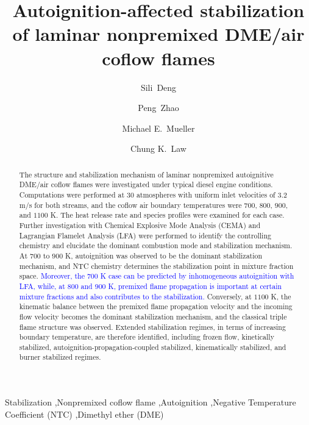 \documentclass[review,3p,times]{elsarticle}
\begin{document}
\begin{frontmatter}

\title{Autoignition-affected stabilization of laminar nonpremixed DME/air coflow flames}

\author{Sili~Deng}
\author{Peng~Zhao}
\author{Michael E.~Mueller}
\author{Chung K.~Law}

\address{Department of Mechanical and Aerospace Engineering, Princeton University, Princeton, NJ 08544, USA}

\begin{abstract}

The structure and stabilization mechanism of laminar nonpremixed autoignitive DME/air coflow flames were investigated under typical diesel engine conditions.  Computations were performed at $30$ atmospheres with uniform inlet velocities of $3.2$ m/s for both streams, and the coflow air boundary temperatures were $700$, $800$, $900$, and $1100$ K.  The heat release rate and species profiles were examined for each case. Further investigation with Chemical Explosive Mode Analysis (CEMA) and Lagrangian Flamelet Analysis (LFA) were performed to identify the controlling chemistry and elucidate the dominant combustion mode and stabilization mechanism.  At $700$ to $900$ K, autoignition was observed to be the dominant stabilization mechanism, and NTC chemistry determines the stabilization point in mixture fraction space.  \textcolor{blue}{Moreover, the $700$ K case can be predicted by inhomogeneous autoignition with LFA, while, at $800$ and $900$ K, premixed flame propagation is important at certain mixture fractions and also contributes to the stabilization.}  Conversely, at $1100$ K, the kinematic balance between the premixed flame propagation velocity and the incoming flow velocity becomes the dominant stabilization mechanism, and the classical triple flame structure was observed.  Extended stabilization regimes, in terms of increasing boundary temperature, are therefore identified, including frozen flow, kinetically stabilized, autoignition-propagation-coupled stabilized, kinematically stabilized, and burner stabilized regimes.           

\end{abstract}

\begin{keyword} 
Stabilization \sep Nonpremixed coflow flame \sep Autoignition \sep Negative Temperature Coefficient (NTC) \sep Dimethyl ether (DME) 
\end{keyword}

\end{frontmatter}
\end{document}
